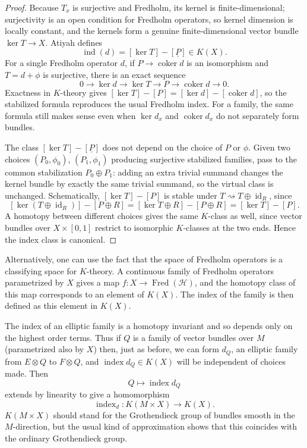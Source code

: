 \documentclass[12pt]{article}
\begin{document}
\begin{proof}
Because $T_x$ is surjective and Fredholm, its kernel is finite-dimensional; surjectivity
is an open condition for Fredholm operators, so kernel dimension is locally constant, and
the kernels form a genuine finite-dimensional vector bundle $\ker T\to X$. Atiyah defines
\[
\operatorname{ind}(d) = [\ker T] - [\underline P] \in K(X).
\]
For
a single Fredholm operator $d$, if $P\to\operatorname{coker}d$ is an isomorphism and
$T=d+\phi$ is surjective, there is an exact sequence
\[
0\to \ker d \to \ker T \to P \to \operatorname{coker}d \to 0.
\]
Exactness in $K$-theory gives $[\ker T]-[P] = [\ker d]-[\operatorname{coker}d]$, so the
stabilized formula reproduces the usual Fredholm index. For a family, the same formula
still makes sense even when $\ker d_x$ and $\operatorname{coker}d_x$ do not separately
form bundles.

The class $[\ker T]-[\underline P]$ does not depend on the choice of $P$ or $\phi$.
Given two choices $(P_0,\phi_0)$, $(P_1,\phi_1)$ producing surjective stabilized families,
pass to the common stabilization $P_0\oplus P_1$: adding an extra trivial summand changes
the kernel bundle by exactly the same trivial summand, so the virtual class is unchanged.
Schematically, $[\ker T]-[P]$ is stable under $T\rightsquigarrow T\oplus\operatorname{id}_R$,
since
\[
[\ker(T\oplus\operatorname{id}_R)] - [P\oplus R]
= [\ker T\oplus R] - [P\oplus R] = [\ker T]-[P].
\]
A homotopy between different choices gives the same $K$-class as well, since vector
bundles over $X\times[0,1]$ restrict to isomorphic $K$-classes at the two ends. Hence the
index class is canonical.
\end{proof}
\begin{remark}
    Alternatively, one can use the fact that the space of Fredholm operators is a classifying space for $K$-theory. A continuous family of Fredholm operators parametrized by $X$ gives a map $f:X\to\operatorname{Fred}(\mathcal H)$, and the homotopy class of this map corresponds to an element of $K(X)$. The index of the family is then defined as this element in $K(X)$.
\end{remark}

The index of an elliptic family is a homotopy invariant and so depends only on the
highest order terms. Thus if $Q$ is a family of vector bundles over $M$ (parametrized
also by $X$) then, just as before, we can form $d_Q$, an elliptic family from $E\otimes Q$
to $F\otimes Q$, and $\operatorname{index}d_Q\in K(X)$ will be independent of choices
made. Then
\[
Q\mapsto \operatorname{index}d_Q
\]
extends by linearity to give a homomorphism
\[
\operatorname{index}_d : K(M\times X)\longrightarrow K(X).
\]
$K(M\times X)$ should stand for the Grothendieck group of bundles smooth in the
$M$-direction, but the usual kind of approximation shows that this coincides with the
ordinary Grothendieck group.
\end{document}
